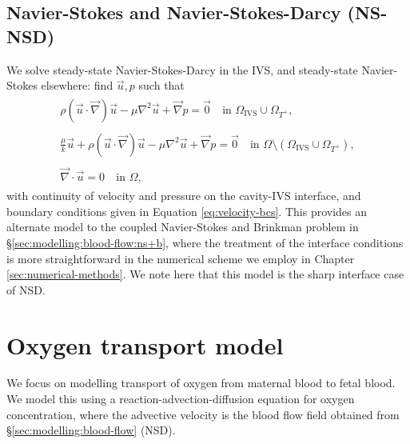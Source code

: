         \subsection{Navier-Stokes and Navier-Stokes-Darcy (NS-NSD)} \label{sec:modelling:blood-flow:ns+nsb}
            We solve steady-state Navier-Stokes-Darcy in the IVS, and steady-state Navier-Stokes elsewhere: find $\vec{u}, p$ such that
            \begin{subequations}
                \begin{align}
                    \begin{split}
                        \rho (\vec{u} \cdot \vec{\nabla}) \vec{u} - \mu \nabla^2 \vec{u} + \vec{\nabla} p = \vec{0} &~ \text{in } \Omega_{\text{IVS}} \cup \Omega_{T^+},
                    \end{split}\\
                    \begin{split}
                        \frac{\mu}{k}\vec{u} + \rho (\vec{u} \cdot \vec{\nabla}) \vec{u} - \mu \nabla^2 \vec{u} + \vec{\nabla} p = \vec{0} &~ \text{in } \Omega \setminus (\Omega_{\text{IVS}} \cup \Omega_{T^+}),
                    \end{split}\\
                    \begin{split}
                        \vec{\nabla} \cdot \vec{u} = 0 &~ \text{in } \Omega,
                    \end{split}%
                \end{align}%
                \label{eq:ns-nsb}%
            \end{subequations}%
            with continuity of velocity and pressure on the cavity-IVS interface, and boundary conditions given in Equation \ref{eq:velocity-bcs}. This provides an alternate model to the coupled Navier-Stokes and Brinkman problem in \S\ref{sec:modelling:blood-flow:ns+b}, where the treatment of the interface conditions is more straightforward in the numerical scheme we employ in Chapter \ref{sec:numerical-methods}. We note here that this model is the sharp interface case of NSD.

    \section{Oxygen transport model} \label{sec:modelling:transport}
        We focus on modelling transport of oxygen from maternal blood to fetal blood. We model this using a reaction-advection-diffusion equation for oxygen concentration, where the advective velocity is the blood flow field obtained from \S\ref{sec:modelling:blood-flow} (NSD).
        
